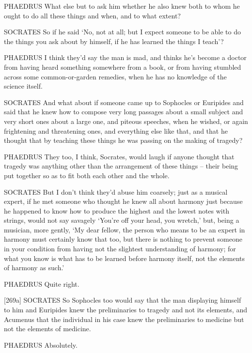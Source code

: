 PHAEDRUS What else but to ask him whether he also knew both to whom he
ought to do all these things and when, and to what extent?

SOCRATES So if he said ‘No, not at all; but I expect someone to be able
to do the things you ask about by himself, if he has  learned
the things I teach'?

PHAEDRUS I think they'd say the man is mad, and thinks he's become a
doctor from having heard something somewhere from a book, or from having
stumbled across some common-or-garden remedies, when he has no knowledge
of the science itself.

SOCRATES And what about if someone came up to Sophocles  or
Euripides and said that he knew how to compose very long passages about
a small subject and very short ones about a large one, and piteous
speeches, when he wished, or again  frightening and threatening
ones, and everything else like that, and that he thought that by
teaching these things he was passing on the making of tragedy?

PHAEDRUS They too, I think, Socrates, would laugh if anyone thought that
tragedy was anything other than the arrangement  of these things
-- their being put together so as to fit both each other and the whole.

SOCRATES But I don't think they'd abuse him coarsely; just as a musical
expert, if he met someone who thought he knew all about harmony just
because he happened to know how to  produce the highest and the
lowest notes with strings, would not say savagely ‘You're off your head,
you wretch,' but, being a musician, more gently, ‘My dear fellow, the
person who means to be an expert in harmony must certainly know that
 too, but there is nothing to prevent someone in your condition
from having not the slightest understanding of harmony; for what you
know is what has to be learned before harmony itself, not the elements
of harmony as such.'

PHAEDRUS Quite right.

{[}269a{]} SOCRATES So Sophocles too would say that the man displaying
himself to him and Euripides knew the preliminaries to tragedy and not
its elements, and Acumenus that the individual in his case knew the
preliminaries to medicine but not the elements of medicine.

PHAEDRUS Absolutely.

